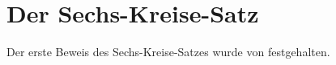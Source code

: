 
\chapter{Der Sechs-Kreise-Satz}

Der erste Beweis des Sechs-Kreise-Satzes wurde von \citet{EMT1974} festgehalten.
